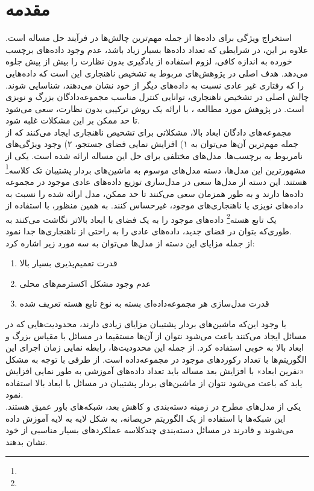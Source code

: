 \documentclass[twocolumn]{article}
\newcommand{\enfootnote}[1]{\footnote{\lr{#1}}}
\begin{document}
\section{مقدمه}
استخراج ویژگی‌ برای داده‌ها از جمله مهم‌ترین چالش‌ها در فرآیند حل مساله است. علاوه بر این، در شرایطی که تعداد داده‌ها بسیار زیاد باشد، عدم وجود داده‌های برچسب خورده به اندازه کافی، لزوم استفاده از یادگیری بدون نظارت را بیش از پیش جلوه می‌دهد. هدف اصلی در پژوهش‌های مربوط به تشخیص ناهنجاری این است که داده‌هایی را که رفتاری غیر عادی نسبت به داده‌های دیگر از خود نشان می‌دهند، شناسایی شوند. چالش اصلی در تشخیص ناهنجاری، توانایی کنترل مناسب مجموعه‌دادگان بزرگ و نویزی است. در پژوهش مورد مطالعه
\cite{erfani2016high}
، با ارائه یک روش ترکیبی بدون نظارت، سعی می‌شود تا حد ممکن بر این مشکلات غلبه شود.
\\
مجموعه‌های دادگان ابعاد بالا، مشکلاتی برای تشخیص ناهنجاری ایجاد می‌کنند که از جمله مهم‌ترین آن‌ها می‌توان به ۱) افزایش نمایی فضای جستجو، ۲) وجود ویژگی‌های نامربوط به برچسب‌ها. مدل‌های مختلفی برای حل این مساله ارائه شده است. یکی از مشهورترین این مدل‌ها، دسته مدل‌های موسوم به ماشین‌های بردار پشتیبان تک کلاسه\enfootnote{One Class SVMs} هستند. این دسته از مدل‌ها سعی در مدل‌سازی توزیع داده‌های عادی موجود در مجموعه داده‌ها دارند و به طور همزمان سعی می‌کنند تا حد ممکن، مدل ارائه شده را نسبت به داده‌های نویزی یا ناهنجاری‌های موجود، غیرحساس کنند. به همین منظور، با استفاده از یک تابع هسته\enfootnote{Kernel Function} داده‌های موجود را به یک فضای با ابعاد بالاتر نگاشت می‌کنند به طوری‌که بتوان در فضای جدید، داده‌های عادی را به راحتی از ناهنجاری‌ها جدا نمود. 
\\
از جمله مزایای این دسته از مدل‌ها می‌توان به سه مورد زیر اشاره کرد:
\begin{enumerate}
\item قدرت تعمیم‌پذیری بسیار بالا
\item عدم وجود مشکل اکسترمم‌های محلی
\item قدرت مدل‌سازی هر مجموعه‌داده‌ای بسته به نوع تابع هسته تعریف شده
\end{enumerate}
با وجود این‌که ماشین‌های بردار پشتیبان مزایای زیادی دارند، محدودیت‌هایی که در مسائل ایجاد می‌کنند باعث می‌شود نتوان از آن‌ها مستقیما در مسائل با مقیاس بزرگ و ابعاد بالا به خوبی استفاده کرد. از جمله این محدودیت‌ها، رابطه نمایی زمان اجرای این الگوریتم‌ها با تعداد رکوردهای موجود در مجموعه‌داده است. از طرفی با توجه به مشکل «نفرین ابعاد» با افزایش بعد مساله باید تعداد داده‌های آموزشی به طور نمایی افزایش یابد که باعث می‌شود نتوان از ماشین‌های بردار پشتیبان در مسائل با ابعاد بالا استفاده نمود.
\\
یکی از مدل‌های مطرح در زمینه دسته‌بندی و کاهش بعد، شبکه‌های باور عمیق هستند. این شبکه‌ها با استفاده از یک الگوریتم حریصانه، به شکل لایه به لایه آموزش داده‌ می‌شوند و قادرند در مسائل دسته‌بندی چندکلاسه عملکردهای بسیار مناسبی از خود نشان بدهند. 
\end{document}
